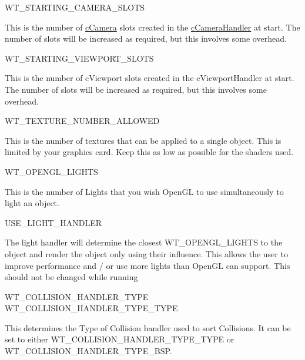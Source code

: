 \begin{DoxyItemize}
\item WT\_\-STARTING\_\-CAMERA\_\-SLOTS
\begin{DoxyItemize}
\item This is the number of \hyperlink{classc_camera}{cCamera} slots created in the \hyperlink{classc_camera_handler}{cCameraHandler} at start. The number of slots will be increased as required, but this involves some overhead.
\end{DoxyItemize}
\item WT\_\-STARTING\_\-VIEWPORT\_\-SLOTS
\begin{DoxyItemize}
\item This is the number of cViewport slots created in the cViewportHandler at start. The number of slots will be increased as required, but this involves some overhead.
\end{DoxyItemize}
\item WT\_\-TEXTURE\_\-NUMBER\_\-ALLOWED
\begin{DoxyItemize}
\item This is the number of textures that can be applied to a single object. This is limited by your graphics card. Keep this as low as possible for the shaders used.
\end{DoxyItemize}
\end{DoxyItemize}
\begin{DoxyItemize}
\item WT\_\-OPENGL\_\-LIGHTS
\begin{DoxyItemize}
\item This is the number of Lights that you wish OpenGL to use simultaneously to light an object.
\end{DoxyItemize}
\end{DoxyItemize}
\begin{DoxyItemize}
\item USE\_\-LIGHT\_\-HANDLER
\begin{DoxyItemize}
\item The light handler will determine the closest WT\_\-OPENGL\_\-LIGHTS to the object and render the object only using their influence. This allows the user to improve performance and / or use more lights than OpenGL can support. This should not be changed while running
\end{DoxyItemize}
\end{DoxyItemize}
\begin{DoxyItemize}
\item WT\_\-COLLISION\_\-HANDLER\_\-TYPE WT\_\-COLLISION\_\-HANDLER\_\-TYPE\_\-TYPE
\begin{DoxyItemize}
\item This determines the Type of Collision handler used to sort Collisions. It can be set to either WT\_\-COLLISION\_\-HANDLER\_\-TYPE\_\-TYPE or WT\_\-COLLISION\_\-HANDLER\_\-TYPE\_\-BSP.
\end{DoxyItemize}
\end{DoxyItemize}
